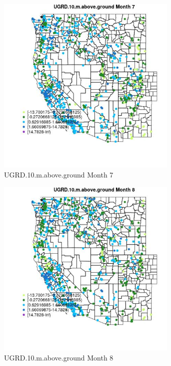 \begin{figure} 
\centering  
\includegraphics[width=0.77\textwidth]{Code_Outputs/Report_ML_input_PM25_Step4_part_e_de_duplicated_aves_compiled_2019-05-21wNAs_MapObsMo7UGRD10maboveground.jpg} 
\caption{\label{fig:Report_ML_input_PM25_Step4_part_e_de_duplicated_aves_compiled_2019-05-21wNAsMapObsMo7UGRD10maboveground}UGRD.10.m.above.ground Month 7} 
\end{figure} 
 

\clearpage 

\begin{figure} 
\centering  
\includegraphics[width=0.77\textwidth]{Code_Outputs/Report_ML_input_PM25_Step4_part_e_de_duplicated_aves_compiled_2019-05-21wNAs_MapObsMo8UGRD10maboveground.jpg} 
\caption{\label{fig:Report_ML_input_PM25_Step4_part_e_de_duplicated_aves_compiled_2019-05-21wNAsMapObsMo8UGRD10maboveground}UGRD.10.m.above.ground Month 8} 
\end{figure} 
 

